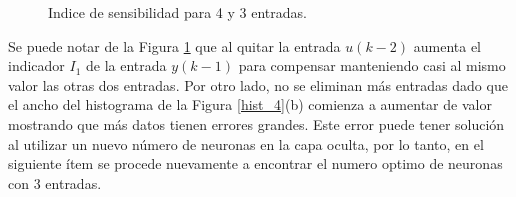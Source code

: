 \documentclass[12pt]{article}
\begin{document}
\begin{itemize}
	\begin{figure}[h!]
		\centering
		\captionsetup{justification=centering}
		\caption{Indice de sensibilidad para 4 y 3 entradas.}
		\label{Ind_4}
	\end{figure}
	Se puede notar de la Figura \ref{Ind_4} que al quitar la entrada $u(k-2)$ aumenta el indicador $I_1$ de la entrada $y(k-1)$ para compensar manteniendo casi al mismo valor las otras dos entradas. Por otro lado, no se eliminan más entradas dado que el ancho del histograma de la Figura \ref{hist_4}(b) comienza a aumentar de valor mostrando que más datos tienen errores grandes. Este error puede tener solución al utilizar un nuevo número de neuronas en la capa oculta, por lo tanto, en el siguiente ítem se procede nuevamente a encontrar el numero optimo de neuronas con 3 entradas.


\end{itemize}
\end{document}
